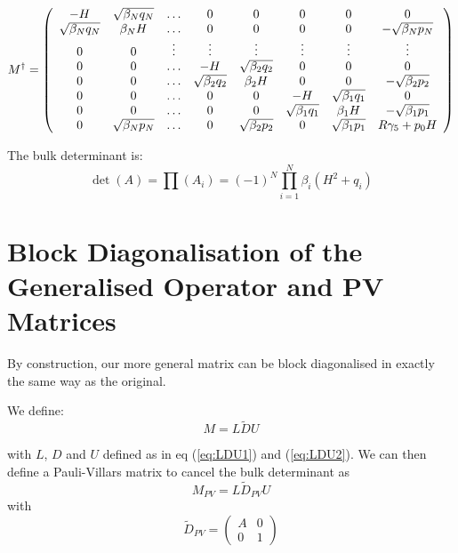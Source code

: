 \documentclass[12pt]{article}
\begin{document}
\begin{equation}
M^{\dagger} = \left( \begin{array}{cccccccc}
-H & \sqrt{\beta_N q_N}& \ldots & 0 & 0 & 0 & 0 & 0 \\
\sqrt{\beta_N q_N} & \beta_N H & \ldots & 0 & 0 & 0& 0 & -\sqrt{\beta_N p_N } \\
 0  &  0  &  \vdots & \vdots & \vdots & \vdots & \vdots & \vdots \\
 0  &  0  & \ldots  & -H  & \sqrt{\beta_2 q_2} & 0 & 0 &  0 \\
 0  &  0  & \ldots  & \sqrt{\beta_2 q_2} & \beta_2 H & 0 & 0 & -\sqrt{\beta_2 p_2} \\
 0  &  0  & \ldots &         0        &  0 & -H & \sqrt{\beta_1 q_1} & 0 \\
 0  &  0  & \ldots &         0        &  0 & \sqrt{\beta_1 q_1} & \beta_1 H & -\sqrt{\beta_1 p_1} \\
 0  & \sqrt{\beta_N p_N} & \ldots & 0 & \sqrt{\beta_2 p_2} & 0 & \sqrt{\beta_1 p_1} & R \gamma_5 + p_0 H 
\end{array} \right)
\end{equation}

The bulk determinant is: 
\begin{equation}
\det(A) = \prod(A_i) = (-1)^{N} \prod_{i=1}^{N} \beta_i ( H^2 + q_{i} )
\end{equation}

\section{Block Diagonalisation of the Generalised Operator and PV Matrices}
By construction, our more general matrix can be block diagonalised
in exactly the same way as the original. 

We define:
\begin{equation}
M = L \tilde{D} U
\end{equation}

with $L$, $D$ and $U$ defined as in eq (\ref{eq:LDU1}) and (\ref{eq:LDU2}).
We can then define a Pauli-Villars matrix to cancel the bulk determinant
as 
\begin{equation}
M_{PV} = L \tilde{D}_{PV} U
\end{equation}
with
\begin{equation}
\tilde{D}_{PV} = \left( \begin{array}{cc} 
 A & 0 \\
 0 & 1 
\end{array} \right)
\end{equation}
\end{document}
